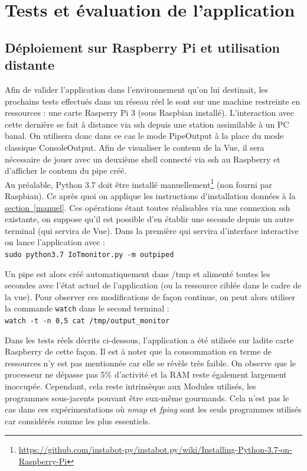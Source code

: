 \documentclass[]{article}
\newcommand{\wordlink}[2]{\hyperref[#1]{#2~\ref{#1}}}
\begin{document}
\newpage


\section{Tests et évaluation de l'application}

\subsection{Déploiement sur Raspberry Pi et utilisation distante}

Afin de valider l'application dans l'environnement qu'on lui destinait, les prochains tests effectués  dans un réseau réel le sont sur une machine restreinte en ressources : une carte Rasperry Pi 3 (sous Raspbian installé). L'interaction avec cette dernière se fait à distance via ssh depuis une station assimilable à un PC banal. On utilisera donc dans ce cas le mode PipeOutput à la place du mode classique ConsoleOutput. Afin de visualiser le contenu de la Vue, il sera nécessaire de jouer avec un deuxième shell connecté via ssh au Raspberry et d'afficher le contenu du pipe créé.\\

Au préalable, Python 3.7 doit être installé manuellement\footnote{\url{https://github.com/instabot-py/instabot.py/wiki/Installing-Python-3.7-on-Raspberry-Pi}} (non fourni par Raspbian). Ce après quoi on applique les instructions d'installation données à la \wordlink{manuel}{section}. Ces opérations étant toutes réalisables via une connexion ssh existante, on suppose qu'il est possible d'en établir une seconde depuis un autre terminal (qui servira de Vue). Dans la première qui servira d'interface interactive on lance l'application avec :~\\

\indent \texttt{sudo python3.7 IoTmonitor.py -m outpiped}
\vspace{0.4cm}
\par Un pipe est alors créé automatiquement dans /tmp et alimenté toutes les secondes avec l'état actuel de l'application (ou la ressource ciblée dans le cadre de la vue). Pour observer ces modifications de façon continue, on peut alors utiliser la commande \texttt{watch} dans le second terminal :~\\

\indent \texttt{watch -t -n 0,5 cat /tmp/output\_monitor}
\vspace{0.4cm}

Dans les tests réels décrits ci-dessous, l'application a été utilisée sur ladite carte Raspberry de cette façon. Il est à noter que la consommation en terme de ressources n'y est pas mentionnée car elle se révèle très faible. On observe que le processeur ne dépasse pas 5\% d'activité et la RAM reste également largement inoccupée. Cependant, cela reste intrinsèque aux Modules utilisés, les programmes sous-jacents pouvant être eux-même gourmands. Cela n'est pas le cas dans ces expérimentations où \textit{nmap} et \textit{fping} sont les seuls programmes utilisés car considérés comme les plus essentiels.
\end{document}
